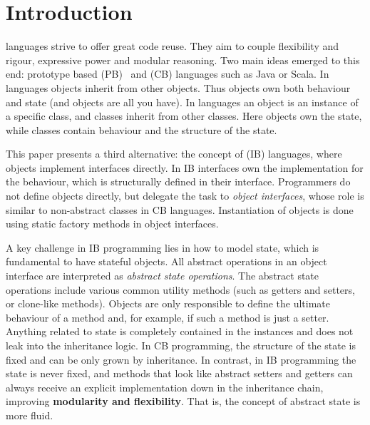 \section{Introduction}\label{sec:intro}

\Objectoriented languages strive to offer great code reuse.
They aim to couple flexibility and rigour, expressive power and
modular reasoning.  Two main ideas emerged to this end: prototype
based (PB)~\cite{Ungar87self} and \classbased (CB) languages such as
Java or Scala.  In \prototypebased
languages objects inherit from other objects. Thus objects own
both behaviour and state (and objects are all you have).
In \classbased languages an object is an instance of a specific class,
and classes inherit from other classes.  Here objects own the state,
while classes contain behaviour and the structure of the state.

This paper presents a third alternative: the concept of
\textbf{\interfacebased} (IB) \objectoriented languages, where objects 
implement interfaces directly. In IB interfaces own the implementation
for the behaviour, which is structurally defined in their
interface. Programmers do not define objects directly, but delegate
the task to \emph{object interfaces}, whose role is similar to non-abstract 
classes in CB languages. Instantiation of objects is
done using static factory methods in object interfaces.

A key challenge in IB programming lies in how to model state, which is
fundamental to have stateful objects. All abstract operations in an
object interface are interpreted as \emph{abstract state
  operations}. The abstract state operations include various common
utility methods (such as getters and setters, or clone-like
methods). Objects are only responsible to define the ultimate
behaviour of a method and, for example, if such a method is just a
setter. Anything related to state is completely contained in the
instances and does not leak into the inheritance logic.  In CB
programming, the structure of the state is fixed and can be only grown
by inheritance.  In contrast, in IB programming the state is never
fixed, and methods that look like abstract setters and getters
can always receive an explicit implementation down in the inheritance
chain, improving \textbf{modularity and flexibility}.  That is, the
concept of abstract state is more fluid.

